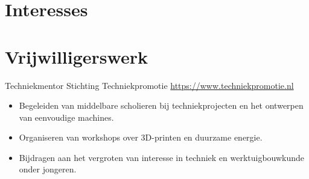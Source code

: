 \documentclass[a4paper, serif, 10pt]{moderncv}
\begin{document}
\section{Interesses}

\section{Vrijwilligerswerk}

        {Techniekmentor}
        {Stichting Techniekpromotie}
        {\url{https://www.techniekpromotie.nl}}
        {}
        {\begin{itemize}
\item Begeleiden van middelbare scholieren bij techniekprojecten en het ontwerpen van eenvoudige machines.
\item Organiseren van workshops over 3D-printen en duurzame energie.
\item Bijdragen aan het vergroten van interesse in techniek en werktuigbouwkunde onder jongeren.
\end{itemize}}
    
\end{document}
